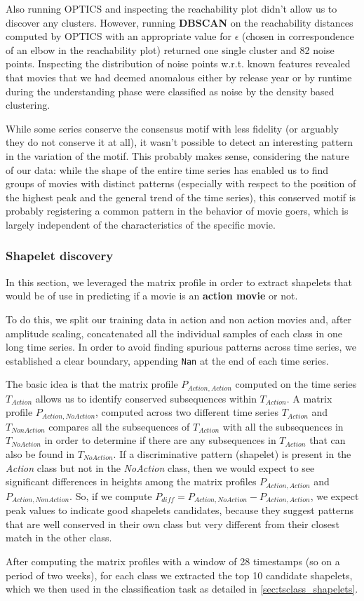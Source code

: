Also running OPTICS and inspecting the reachability plot didn't allow us to discover any clusters. However, running \textbf{DBSCAN} on the reachability distances computed by OPTICS with an appropriate value for $\epsilon$ (chosen in correspondence of an elbow in the reachability plot) returned one single cluster and 82 noise points. Inspecting the distribution of noise points w.r.t. known features revealed that movies that we had deemed anomalous either by release year or by runtime during the understanding phase were classified as noise by the density based clustering.

While some series conserve the consensus motif with less fidelity (or arguably they do not conserve it at all), it wasn't possible to detect an interesting pattern in the variation of the motif.
This probably makes sense, considering the nature of our data: while the shape of the entire time series has enabled us to find groups of movies with distinct patterns (especially with respect to the position of the highest peak and the general trend of the time series), this conserved motif is probably registering a common pattern in the behavior of movie goers, which is largely independent of the characteristics of the specific movie.

\subsubsection{Shapelet discovery}\label{sec:shapelet_discovery}

In this section, we leveraged the matrix profile in order to extract shapelets that would be of use in predicting if a movie is an \textbf{action movie} or not.

To do this, we split our training data in action and non action movies and, after amplitude scaling, concatenated all the individual samples of each class in one long time series. In order to avoid finding spurious patterns across time series, we established a clear boundary, appending \texttt{Nan} at the end of each time series.

The basic idea is that the matrix profile $P_{Action,Action}$ computed on the time series $T_{Action}$ allows us to identify conserved subsequences within $T_{Action}$. A matrix profile $P_{Action,NoAction}$, computed across two different time series $T_{Action}$ and $T_{NonAction}$ compares all the subsequences of $T_{Action}$ with all the subsequences in $T_{NoAction}$ in order to determine if there are any subsequences in $T_{Action}$ that can also be found in $T_{NoAction}$.
If a discriminative pattern (shapelet) is present in the \emph{Action} class but not in the \emph{NoAction} class, then we would expect to see significant differences in heights among the matrix profiles $P_{Action,Action}$ and $P_{Action,NonAction}$. So, if we compute $P_{diff} = P_{Action,NoAction} - P_{Action,Action}$, we expect peak values to indicate good shapelets candidates, because they suggest patterns that are well conserved in their own class but very different from their closest match in the other class.

After computing the matrix profiles with a window of 28 timestamps (so on a period of two weeks), for each class we extracted the top 10 candidate shapelets, which we then used in the classification task as detailed in \ref{sec:tsclass_shapelets}.